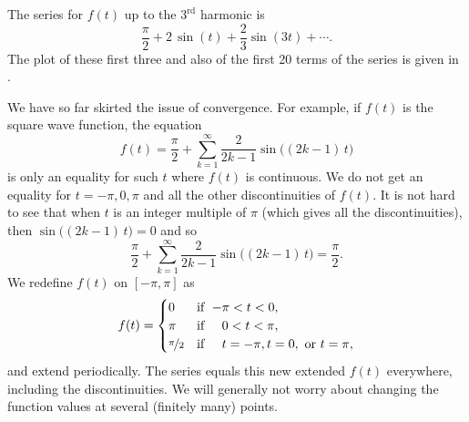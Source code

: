 \begin{example}
The series for $f(t)$ up to the
$3^{\text{rd}}$ harmonic is
\begin{equation*}
\frac{\pi}{2}
+
2 \, \sin (t)
+
\frac{2}{3}  \sin (3t)
+ \cdots .
\end{equation*}
The plot of these first three and also of the first 20 terms of the series
is given in
.

\begin{myfig}
\capstart
\caption{First 3 (left graph) and 20 (right graph) harmonics of the
square wave function.\label{ts:squarewavefsfig}}
\end{myfig}
\end{example}

We have so far skirted the issue of convergence.  For example,
if $f(t)$ is the square wave function,
the equation
\begin{equation*}
f(t) = 
\frac{\pi}{2} + \sum_{k=1}^\infty
\frac{2}{2k-1} 
\sin \bigl( (2k-1)\, t \bigr)
\end{equation*}
is only an equality for such $t$ where $f(t)$ is continuous.
We do not get an equality for $t=-\pi,0,\pi$ and all the other discontinuities
of $f(t)$.  It is not hard to see that when $t$ is an integer multiple of
$\pi$ (which gives all the discontinuities), then
$\sin \bigl( (2k-1)\, t \bigr) = 0$ and so
\begin{equation*}
\frac{\pi}{2} + \sum_{k=1}^\infty
\frac{2}{2k-1} 
\sin \bigl( (2k-1)\, t \bigr) = \frac{\pi}{2} .
\end{equation*}
We redefine $f(t)$ on $[-\pi,\pi]$ as
\begin{equation*}
f(t) =
\begin{cases}
0 & \text{if } \; {-\pi} < t < 0 , \\
\pi & \text{if } \; \phantom{-}0 < t < \pi , \\
\nicefrac{\pi}{2} & \text{if } \; \phantom{-}t = -\pi, 
t = 0,\text{ or }
t = \pi,
\end{cases}
\end{equation*}
and extend periodically.
The series equals this new extended $f(t)$ everywhere, including the
discontinuities.
We will generally not worry about changing the function values
at several (finitely many) points.

